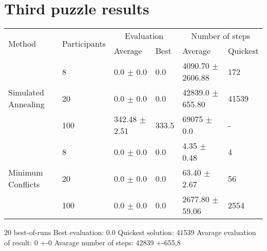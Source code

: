 \section{Third puzzle results}


\begin{table*}\centering
    \caption{}
    \label{tab:roundrobin}
	\vspace{2mm}
	\begin{tabular}{llllll}
		\toprule[2.0px]
			\multirow{2}{*}{Method} & 
			\multirow{2}{*}{Participants} & 
			\multicolumn{2}{c}{Evaluation} 	& 
			\multicolumn{2}{c}{Number of steps}\\
			   &          & Average & Best & Average & Quickest \\ 
		\midrule
		\multirow{3}{*}{Simulated Annealing} 
			& 8  & 0.0 $\pm$ 0.0 & 0.0 &  4090.70 $\pm$ 2606.88 & 172\\ %
			& 20 & 0.0 $\pm$ 0.0 & 0.0 &  42839.0 $\pm$ 655.80  & 41539 \\ %
			& 100& 342.48 $\pm$ 2.51 & 333.5 & 69075 $\pm$ 0.0 & - \\ %
		\multirow{3}{*}{Minimum Conflicts}
			& 8  & 0.0 $\pm$ 0.0 & 0.0 & 4.35 $\pm$ 0.48 & 4\\ %
			& 20 & 0.0 $\pm$ 0.0 & 0.0 & 63.40 $\pm$ 2.67 & 56\\ %
			& 100 & 0.0 $\pm$ 0.0 & 0.0 & 2677.80 $\pm$ 59.06& 2554 \\ %
		\bottomrule[2.0px]
	\end{tabular}
\end{table*}

20 best-of-runs
Best evaluation: 0.0
Quickest solution: 41539
Avarage evaluation of result: 0 +-0
Avarage number of steps: 42839 +-655,8
